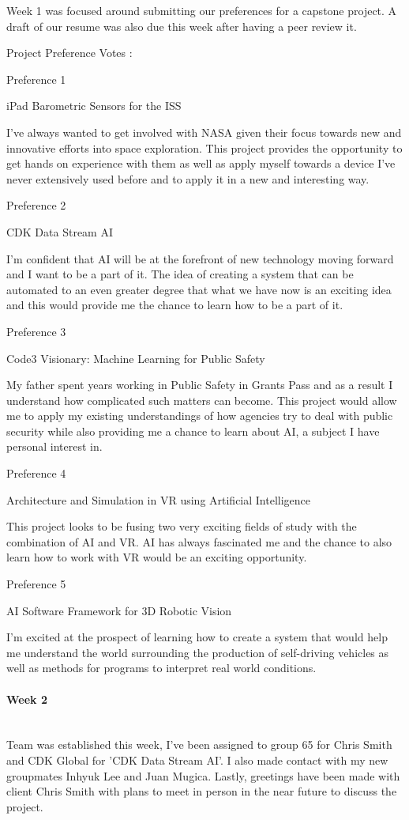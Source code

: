 \documentclass[article, onecolumn, draftclsnofoot,10pt, compsoc]{IEEEtran}
\begin{document}
Week 1 was focused around submitting our preferences for a capstone project. A draft of our resume was also due this week after having a peer review it.

Project Preference Votes :

Preference 1

iPad Barometric Sensors for the ISS

I've always wanted to get involved with NASA given their focus towards new and innovative efforts into space exploration. This project provides the opportunity to get hands on experience with them as well as apply myself towards a device I've never extensively used before and to apply it in a new and interesting way.

Preference 2

CDK Data Stream AI

I'm confident that AI will be at the forefront of new technology moving forward and I want to be a part of it. The idea of creating a system that can be automated to an even greater degree that what we have now is an exciting idea and this would provide me the chance to learn how to be a part of it.

Preference 3

Code3 Visionary: Machine Learning for Public Safety 

My father spent years working in Public Safety in Grants Pass and as a result I understand how complicated such matters can become. This project would allow me to apply my existing understandings of how agencies try to deal with public security while also providing me a chance to learn about AI, a subject I have personal interest in.

Preference 4

Architecture and Simulation in VR using Artificial Intelligence

This project looks to be fusing two very exciting fields of study with the combination of AI and VR. AI has always fascinated me and the chance to also learn how to work with VR would be an exciting opportunity.

Preference 5

AI Software Framework for 3D Robotic Vision

I'm excited at the prospect of learning how to create a system that would help me understand the world surrounding the production of self-driving vehicles as well as methods for programs to interpret real world conditions.


\paragraph{Week 2}
\mbox{}\\
Team was established this week, I've been assigned to group 65 for Chris Smith and CDK Global for 'CDK Data Stream AI'. I also made contact with my new groupmates Inhyuk Lee and Juan Mugica. Lastly, greetings have been made with client Chris Smith with plans to meet in person in the near future to discuss the project.
\end{document}
